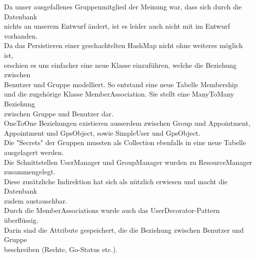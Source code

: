 Da unser ausgefallenes Gruppenmitglied der Meinung war, dass sich durch die Datenbank\\
nichts an unserem Entwurf ändert, ist es leider auch nicht mit im Entwurf vorhanden.\\
Da das Persistieren einer geschachtelten HashMap nicht ohne weiteres möglich ist,\\
erschien es uns einfacher eine neue Klasse einzuführen, welche die Beziehung zwischen\\
Benutzer und Gruppe modelliert. So entstand eine neue Tabelle Membership\\
und die zugehörige Klasse MemberAssociation. Sie stellt eine ManyToMany Beziehung \\
zwischen Gruppe und Benutzer dar.\\
OneToOne Beziehungen existieren ausserdem zwischen Group und Appointment,\\
Appointment und GpsObject, sowie SimpleUser und GpsObject.\\
Die "Secrets" der Gruppen mussten als Collection ebenfalls in eine neue Tabelle\\
ausgelagert werden.\\

Die Schnittstellen UserManager und GroupManager wurden zu ResourceManager zusammengelegt.\\
Diese zusätzliche Indirektion hat sich als nützlich erwiesen und macht die Datenbank\\
zudem austauschbar.\\

Durch die MemberAssociations wurde auch das UserDecorator-Pattern überflüssig.\\
Darin sind die Attribute gespeichert, die die Beziehung zwischen Benutzer und Gruppe\\
beschreiben (Rechte, Go-Status etc.).\\
